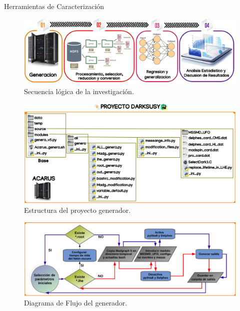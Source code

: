 \begin{frame}{Herramientas de Caracterización}
\begin{figure}[h]
\centering
\includegraphics[width=1\textwidth]{Imag/procesos_darksusy.png}
\caption{Secuencia lógica de la investigación.}
\end{figure}

\framebreak

\begin{figure}[h]
\centering
\includegraphics[width=1\textwidth]{Imag/proyecto_darksusy.png}
\caption{Estructura del proyecto generador.}
\end{figure}

\framebreak

\begin{figure}[h]
\centering
\includegraphics[width=1\textwidth]{Imag/proyecto_darksusy2.png}
\caption{Diagrama de Flujo del generador.}
\end{figure}

\framebreak


\end{frame}

